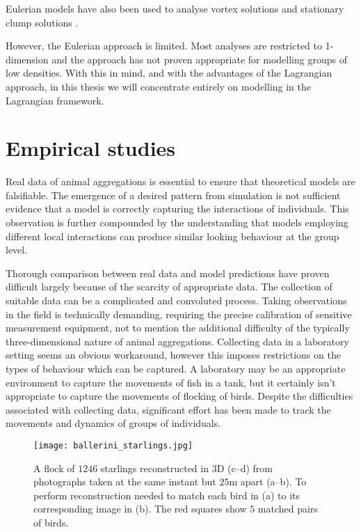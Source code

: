 Eulerian models have also been used to analyse vortex solutions \citep{topaz04} and stationary clump solutions \citep{topaz06}.

However, the Eulerian approach is limited. Most analyses are restricted to 1-dimension and the approach has not proven appropriate for modelling groups of low densities. With this in mind, and with the advantages of the Lagrangian approach, in this thesis we will concentrate entirely on modelling in the Lagrangian framework.

\section{Empirical studies}
\label{sec:empirical_studies}

Real data of animal aggregations is essential to ensure that theoretical models are falsifiable. The emergence of a desired pattern from simulation is not sufficient evidence that a model is correctly capturing the interactions of individuals. This observation is further compounded by the understanding that models employing different local interactions can produce similar looking behaviour at the group level.

Thorough comparison between real data and model predictions have proven difficult largely because of the scarcity of appropriate data. The collection of suitable data can be a complicated and convoluted process. Taking observations in the field is technically demanding, requiring the precise calibration of sensitive measurement equipment, not to mention the additional difficulty of the typically three-dimensional nature of animal aggregations. Collecting data in a laboratory setting seems an obvious workaround, however this imposes restrictions on the types of behaviour which can be captured. A laboratory may be an appropriate environment to capture the movements of fish in a tank, but it certainly isn't appropriate to capture the movements of flocking of birds. Despite the difficulties associated with collecting data, significant effort has been made to track the movements and dynamics of groups of individuals.

\begin{figure}[t]
	\texttt{[image: ballerini\_starlings.jpg]}
	\caption{A flock of $1246$ starlings reconstructed in $3$D (c--d) from photographs taken at the same instant but $25$m apart (a--b).  To perform reconstruction \citet{ballerini08} needed to match each bird in (a) to its corresponding image in (b). The red squares show $5$ matched pairs of birds.}
\end{figure}

